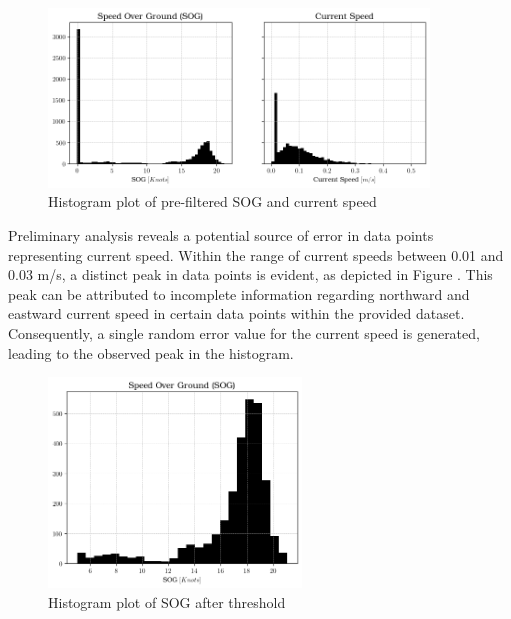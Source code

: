 \begin{figure}[h!]
    \centering
        \includegraphics[width=0.9\textwidth]{02_figures/sog_curspeed_anomalies.png}
        \caption{Histogram plot of pre-filtered SOG and current speed}
        \label{fig:anomalies_sog_curspeed}
\end{figure}

Preliminary analysis reveals a potential source of error in data points representing current speed. Within the range of current speeds between 0.01 and 0.03 m/s, a distinct peak in data points is evident, as depicted in Figure . This peak can be attributed to incomplete information regarding northward and eastward current speed in certain data points within the provided dataset. Consequently, a single random error value for the current speed is generated, leading to the observed peak in the histogram.\\

\begin{figure}[h]
    \centering
        \includegraphics[width=0.6\textwidth]{02_figures/hist_init_sog_postfilter.png}
        \caption{Histogram plot of SOG after threshold}
        \label{fig:SOG_greater_five}
\end{figure}

